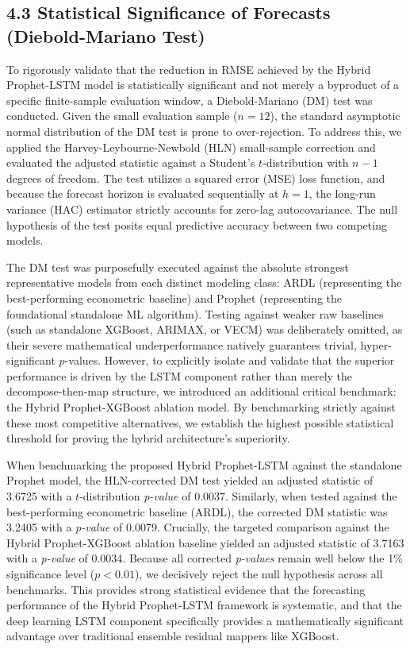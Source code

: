 \documentclass[12pt, letterpaper]{article}
\begin{document}
\subsection*{4.3 Statistical Significance of Forecasts (Diebold-Mariano Test)}
To rigorously validate that the reduction in RMSE achieved by the Hybrid Prophet-LSTM model is statistically significant and not merely a byproduct of a specific finite-sample evaluation window, a Diebold-Mariano (DM) test was conducted. Given the small evaluation sample ($n=12$), the standard asymptotic normal distribution of the DM test is prone to over-rejection. To address this, we applied the Harvey-Leybourne-Newbold (HLN) small-sample correction and evaluated the adjusted statistic against a Student's $t$-distribution with $n-1$ degrees of freedom. The test utilizes a squared error (MSE) loss function, and because the forecast horizon is evaluated sequentially at $h=1$, the long-run variance (HAC) estimator strictly accounts for zero-lag autocovariance. The null hypothesis of the test posits equal predictive accuracy between two competing models. 

The DM test was purposefully executed against the absolute strongest representative models from each distinct modeling class: ARDL (representing the best-performing econometric baseline) and Prophet (representing the foundational standalone ML algorithm). Testing against weaker raw baselines (such as standalone XGBoost, ARIMAX, or VECM) was deliberately omitted, as their severe mathematical underperformance natively guarantees trivial, hyper-significant $p$-values. However, to explicitly isolate and validate that the superior performance is driven by the LSTM component rather than merely the decompose-then-map structure, we introduced an additional critical benchmark: the Hybrid Prophet-XGBoost ablation model. By benchmarking strictly against these most competitive alternatives, we establish the highest possible statistical threshold for proving the hybrid architecture's superiority.

When benchmarking the proposed Hybrid Prophet-LSTM against the standalone Prophet model, the HLN-corrected DM test yielded an adjusted statistic of 3.6725 with a $t$-distribution \textit{p-value} of 0.0037. Similarly, when tested against the best-performing econometric baseline (ARDL), the corrected DM statistic was 3.2405 with a \textit{p-value} of 0.0079. Crucially, the targeted comparison against the Hybrid Prophet-XGBoost ablation baseline yielded an adjusted statistic of 3.7163 with a \textit{p-value} of 0.0034. Because all corrected \textit{p-values} remain well below the 1\% significance level ($p < 0.01$), we decisively reject the null hypothesis across all benchmarks. This provides strong statistical evidence that the forecasting performance of the Hybrid Prophet-LSTM framework is systematic, and that the deep learning LSTM component specifically provides a mathematically significant advantage over traditional ensemble residual mappers like XGBoost.
\end{document}
